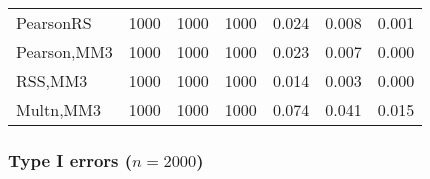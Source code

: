 \documentclass[
]{article}
\begin{document}
\begin{table}[H]
{\begin{tabular}[t]{lrrrrrr}
\hspace{1em}PearsonRS & 1000 & 1000 & 1000 & 0.024 & 0.008 & 0.001\\
\hspace{1em}Pearson,MM3 & 1000 & 1000 & 1000 & 0.023 & 0.007 & 0.000\\
\hspace{1em}RSS,MM3 & 1000 & 1000 & 1000 & 0.014 & 0.003 & 0.000\\
\hspace{1em}Multn,MM3 & 1000 & 1000 & 1000 & 0.074 & 0.041 & 0.015\\
\bottomrule
\end{tabular}}
\end{table}

\hypertarget{type-i-errors-n2000-2}{%
\subsubsection{\texorpdfstring{Type I errors
(\(n=2000\))}{Type I errors (n=2000)}}\label{type-i-errors-n2000-2}}
\end{document}
